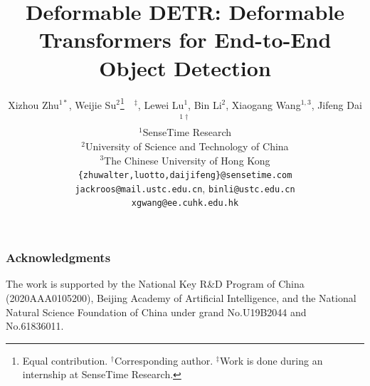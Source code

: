 \documentclass{article}
\title{Deformable DETR: Deformable Transformers for End-to-End Object Detection}
\author{Xizhou Zhu$^{1*}$, Weijie Su$^{2}$\thanks{Equal contribution. $^{\dag}$Corresponding author. $^{\ddag}$Work is done during an internship at SenseTime Research.}~~$^{\ddag}$, Lewei Lu$^{1}$, Bin Li$^{2}$, Xiaogang Wang$^{1,3}$, Jifeng Dai$^{1\dag}$  \\
$^{1}$SenseTime Research \\
$^{2}$University of Science and Technology of China \\
$^{3}$The Chinese University of Hong Kong
\\
\texttt{\{zhuwalter,luotto,daijifeng\}@sensetime.com} \\
\texttt{jackroos@mail.ustc.edu.cn}, \texttt{binli@ustc.edu.cn}
\\
\texttt{xgwang@ee.cuhk.edu.hk}
}
\begin{document}
\maketitle









\subsubsection*{Acknowledgments}
The work is supported by the National Key R\&D Program of China (2020AAA0105200), Beijing Academy of Artificial Intelligence, and the National Natural Science Foundation of China under grand No.U19B2044 and No.61836011.




\clearpage

\end{document}
